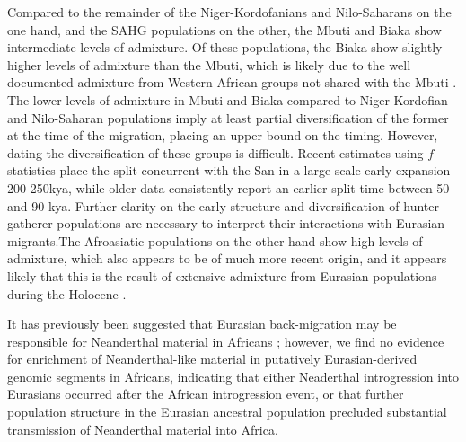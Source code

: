 \documentclass{article}
\begin{document}
Compared to the remainder of the Niger-Kordofanians and Nilo-Saharans on the one hand, and the SAHG populations on the other, the Mbuti and Biaka show intermediate levels of admixture. Of these populations, the Biaka show slightly higher levels of admixture than the Mbuti, which is likely due to the well documented admixture from Western African groups not shared with the Mbuti \cite{Chen2020, Batini2011}. The lower levels of admixture in Mbuti and Biaka compared to Niger-Kordofian and Nilo-Saharan populations imply at least partial diversification of the former at the time of the migration, placing an upper bound on the timing. However, dating the diversification of these groups is difficult. Recent estimates using $f$ statistics place the split concurrent with the San in a large-scale early expansion 200-250kya, while older data consistently report an earlier split time between 50 and 90 kya. Further clarity on the early structure and diversification of hunter-gatherer populations are necessary to interpret their interactions with Eurasian migrants.The  Afroasiatic populations on the other hand show high levels of admixture, which also appears to be of much more recent origin, and it appears likely that this is the result of extensive admixture from Eurasian populations during the Holocene \cite{Busby2016, Fan2019}. 

It has previously been suggested that Eurasian back-migration may be responsible for Neanderthal material in Africans \cite{Chen2020}; however, we find no evidence for enrichment of Neanderthal-like material in putatively Eurasian-derived genomic segments in Africans, indicating that either Neaderthal introgression into Eurasians occurred after the African introgression event, or that further population structure in the Eurasian ancestral population precluded substantial transmission of Neanderthal material into Africa.
\end{document}

